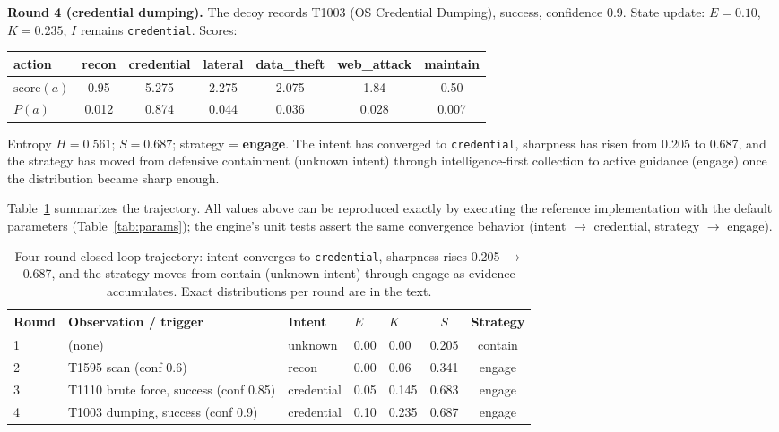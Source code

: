\documentclass[11pt]{article}
\newcommand{\act}[1]{\texttt{#1}}
\begin{document}
\textbf{Round 4 (credential dumping).} The decoy records T1003 (OS
Credential Dumping), success, confidence 0.9. State update: $E = 0.10$,
$K = 0.235$, $I$ remains \act{credential}. Scores:
\begin{center}
\begin{adjustbox}{max width=\linewidth}\begin{tabular}{lcccccc}
\toprule
action & recon & credential & lateral & data\_theft & web\_attack & maintain \\
\midrule
$\mathrm{score}(a)$ & 0.95 & 5.275 & 2.275 & 2.075 & 1.84 & 0.50 \\
$P(a)$ & 0.012 & 0.874 & 0.044 & 0.036 & 0.028 & 0.007 \\
\bottomrule
\end{tabular}\end{adjustbox}
\end{center}
Entropy $H = 0.561$; $S = 0.687$; strategy = \textbf{engage}. The intent
has converged to \act{credential}, sharpness has risen from 0.205 to
0.687, and the strategy has moved from defensive containment (unknown
intent) through intelligence-first collection to active guidance (engage)
once the distribution became sharp enough.

Table~\ref{tab:trace} summarizes the trajectory. All values above can be
reproduced exactly by executing the reference implementation with the
default parameters (Table~\ref{tab:params}); the engine's unit tests
assert the same convergence behavior (intent $\to$ credential, strategy
$\to$ engage).

\begin{table}[ht]
\centering
\begin{adjustbox}{max width=\linewidth}\begin{tabular}{@{}lllllcc@{}}
\toprule
\textbf{Round} & \textbf{Observation / trigger} & \textbf{Intent} & $E$ & $K$ & $S$ & \textbf{Strategy} \\
\midrule
1 & (none) & unknown & 0.00 & 0.00 & 0.205 & contain \\
2 & T1595 scan (conf 0.6) & recon & 0.00 & 0.06 & 0.341 & engage \\
3 & T1110 brute force, success (conf 0.85) & credential & 0.05 & 0.145 & 0.683 & engage \\
4 & T1003 dumping, success (conf 0.9) & credential & 0.10 & 0.235 & 0.687 & engage \\
\bottomrule
\end{tabular}\end{adjustbox}
\caption{Four-round closed-loop trajectory: intent converges to
\act{credential}, sharpness rises 0.205 $\to$ 0.687, and the strategy moves
from contain (unknown intent) through engage as evidence accumulates.
Exact distributions per round are in the text.}
\label{tab:trace}
\end{table}
\end{document}
